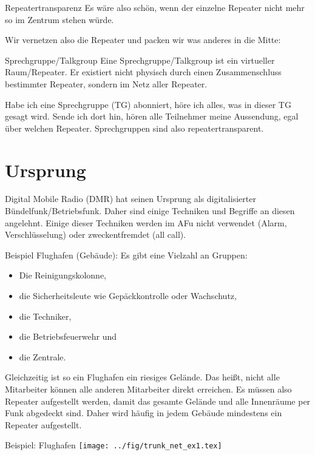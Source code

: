 \documentclass[aspectratio=169]{beamer}
\begin{document}
\begin{frame}{Repeatertransparenz}
Es wäre also schön, wenn der einzelne Repeater nicht mehr so im Zentrum stehen würde. 

\pause Wir vernetzen also die Repeater und packen wir was anderes in die Mitte:
\begin{block}{Sprechgruppe/Talkgroup}
 Eine Sprechgruppe/Talkgroup ist ein virtueller Raum/Repeater. Er existiert nicht physisch durch einen Zusammenschluss bestimmter Repeater, sondern im Netz aller Repeater. 
 
 Habe ich eine Sprechgruppe (TG) abonniert, höre ich alles, was in dieser TG gesagt wird. Sende ich dort hin, hören alle Teilnehmer meine Aussendung, egal über welchen Repeater. Sprechgruppen sind also repeatertransparent.
\end{block}
\end{frame}


\section{Ursprung}
\begin{frame}
Digital Mobile Radio (DMR) hat seinen Ursprung als digitalisierter Bündelfunk/Betriebsfunk. Daher sind einige Techniken und Begriffe an diesen angelehnt. Einige dieser Techniken werden im AFu nicht verwendet (Alarm, Verschlüsselung) oder zweckentfremdet (all call). 

Beispiel Flughafen (Gebäude): Es gibt eine Vielzahl an Gruppen:
\begin{itemize}
 \item Die Reinigungskolonne,
 \item die Sicherheitsleute wie Gepäckkontrolle oder Wachschutz,
 \item die Techniker,
 \item die Betriebsfeuerwehr und
 \item die Zentrale.
\end{itemize}
Gleichzeitig ist so ein Flughafen ein riesiges Gelände. Das heißt, nicht alle Mitarbeiter können alle anderen Mitarbeiter direkt erreichen. Es müssen also Repeater aufgestellt werden, damit das gesamte Gelände und alle Innenräume per Funk abgedeckt sind. Daher wird häufig in jedem Gebäude mindestens ein Repeater aufgestellt. 
\end{frame}

\begin{frame}{Beispiel: Flughafen}
\centering
\texttt{[image: ../fig/trunk\_net\_ex1.tex]}
\end{frame}
\end{document}

